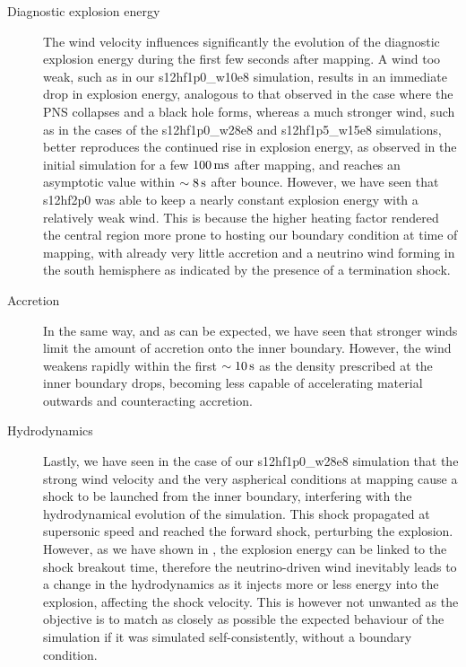 \begin{description}
    \item[Diagnostic explosion energy] The wind velocity influences significantly the evolution of the diagnostic explosion energy during the first few seconds after mapping. A wind too weak, such as in our s12hf1p0\_w10e8 simulation, results in an immediate drop in explosion energy, analogous to that observed in the case where the PNS collapses and a black hole forms, whereas a much stronger wind, such as in the cases of the s12hf1p0\_w28e8 and s12hf1p5\_w15e8 simulations, better reproduces the continued rise in explosion energy, as observed in the initial simulation for a few \(100\,\mathrm{ms}\) after mapping, and reaches an asymptotic value within \(\sim8\,\mathrm{s}\) after bounce. However, we have seen that s12hf2p0 was able to keep a nearly constant explosion energy with a relatively weak wind. This is because the higher heating factor rendered the central region more prone to hosting our boundary condition at time of mapping, with already very little accretion and a neutrino wind forming in the south hemisphere as indicated by the presence of a termination shock.

    \item[Accretion] In the same way, and as can be expected, we have seen that stronger winds limit the amount of accretion onto the inner boundary. However, the wind weakens rapidly within the first \(\sim10\,\mathrm{s}\) as the density prescribed at the inner boundary drops, becoming less capable of accelerating material outwards and counteracting accretion.

    \item[Hydrodynamics] Lastly, we have seen in the case of our s12hf1p0\_w28e8 simulation that the strong wind velocity and the very aspherical conditions at mapping cause a shock to be launched from the inner boundary, interfering with the hydrodynamical evolution of the simulation. This shock propagated at supersonic speed and reached the forward shock, perturbing the explosion. However, as we have shown in , the explosion energy can be linked to the shock breakout time, therefore the neutrino-driven wind inevitably leads to a change in the hydrodynamics as it injects more or less energy into the explosion, affecting the shock velocity. This is however not unwanted as the objective is to match as closely as possible the expected behaviour of the simulation if it was simulated self-consistently, without a boundary condition.
\end{description}

